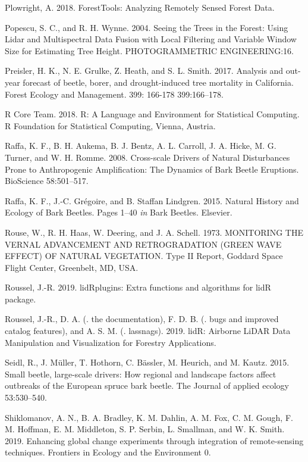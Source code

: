 \documentclass[]{article}
\begin{document}
\hypertarget{ref-plowright2018}{}
Plowright, A. 2018. ForestTools: Analyzing Remotely Sensed Forest Data.

\hypertarget{ref-popescu2004}{}
Popescu, S. C., and R. H. Wynne. 2004. Seeing the Trees in the Forest:
Using Lidar and Multispectral Data Fusion with Local Filtering and
Variable Window Size for Estimating Tree Height. PHOTOGRAMMETRIC
ENGINEERING:16.

\hypertarget{ref-preisler2017}{}
Preisler, H. K., N. E. Grulke, Z. Heath, and S. L. Smith. 2017. Analysis
and out-year forecast of beetle, borer, and drought-induced tree
mortality in California. Forest Ecology and Management. 399: 166-178
399:166--178.

\hypertarget{ref-rcoreteam2018}{}
R Core Team. 2018. R: A Language and Environment for Statistical
Computing. R Foundation for Statistical Computing, Vienna, Austria.

\hypertarget{ref-raffa2008}{}
Raffa, K. F., B. H. Aukema, B. J. Bentz, A. L. Carroll, J. A. Hicke, M.
G. Turner, and W. H. Romme. 2008. Cross-scale Drivers of Natural
Disturbances Prone to Anthropogenic Amplification: The Dynamics of Bark
Beetle Eruptions. BioScience 58:501--517.

\hypertarget{ref-raffa2015}{}
Raffa, K. F., J.-C. Grégoire, and B. Staffan Lindgren. 2015. Natural
History and Ecology of Bark Beetles. Pages 1--40 \emph{in} Bark Beetles.
Elsevier.

\hypertarget{ref-rouse1973}{}
Rouse, W., R. H. Haas, W. Deering, and J. A. Schell. 1973. MONITORING
THE VERNAL ADVANCEMENT AND RETROGRADATION (GREEN WAVE EFFECT) OF NATURAL
VEGETATION. Type II Report, Goddard Space Flight Center, Greenbelt, MD,
USA.

\hypertarget{ref-roussel2019a}{}
Roussel, J.-R. 2019. lidRplugins: Extra functions and algorithms for
lidR package.

\hypertarget{ref-roussel2019}{}
Roussel, J.-R., D. A. (. the documentation), F. D. B. (. bugs and
improved catalog features), and A. S. M. (. lassnags). 2019. lidR:
Airborne LiDAR Data Manipulation and Visualization for Forestry
Applications.

\hypertarget{ref-seidl2015}{}
Seidl, R., J. Müller, T. Hothorn, C. Bässler, M. Heurich, and M. Kautz.
2015. Small beetle, large-scale drivers: How regional and landscape
factors affect outbreaks of the European spruce bark beetle. The Journal
of applied ecology 53:530--540.

\hypertarget{ref-shiklomanov2019}{}
Shiklomanov, A. N., B. A. Bradley, K. M. Dahlin, A. M. Fox, C. M. Gough,
F. M. Hoffman, E. M. Middleton, S. P. Serbin, L. Smallman, and W. K.
Smith. 2019. Enhancing global change experiments through integration of
remote-sensing techniques. Frontiers in Ecology and the Environment 0.
\end{document}
